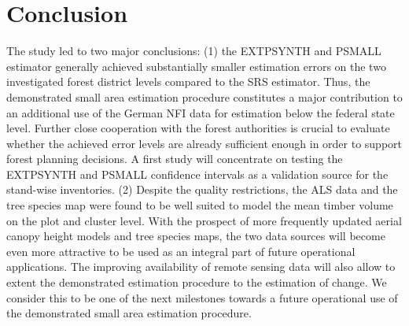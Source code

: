\documentclass[remotesensing,article,submit,moreauthors,pdftex,10pt,a4paper]{mdpi}
\newcommand{\psmall}{PSMALL}
\newcommand{\extpsynth}{EXTPSYNTH}
\begin{document}

\section{Conclusion}
\label{sec:concl}

The study led to two major conclusions: (1) the \extpsynth{} and \psmall{} estimator generally achieved substantially smaller estimation errors on the two investigated forest district levels compared to the SRS estimator. Thus, the demonstrated small area estimation procedure constitutes a major contribution to an additional use of the German NFI data for estimation below the federal state level. Further close cooperation with the forest authorities is crucial to evaluate whether the achieved error levels are already sufficient enough in order to support forest planning decisions. A first study will concentrate on testing the \extpsynth{} and \psmall{} confidence intervals as a validation source for the stand-wise inventories. (2) Despite the quality restrictions, the ALS data and the tree species map were found to be well suited to model the mean timber volume on the plot and cluster level. With the prospect of more frequently updated aerial canopy height models and tree species maps, the two data sources will become even more attractive to be used as an integral part of future operational applications. The improving availability of remote sensing data will also allow to extent the demonstrated estimation procedure to the estimation of change. We consider this to be one of the next milestones towards a future operational use of the demonstrated small area estimation procedure.




\vspace{6pt} 
%
%
%
%
\end{document}
